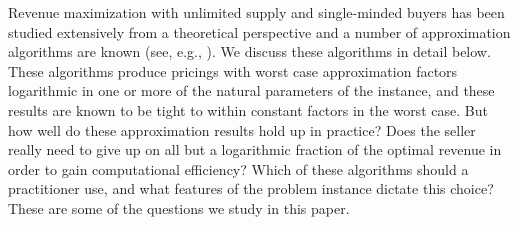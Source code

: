 
Revenue maximization with unlimited supply and single-minded buyers has been studied extensively from a theoretical perspective and a number of approximation algorithms are known (see, e.g., \cite{guruswami2005profit,balcan2006approximation,briest2006single}). We discuss these algorithms in detail below. These algorithms produce pricings with worst case approximation factors logarithmic in one or more of the natural parameters of the instance, and these results are known to be tight to within constant factors in the worst case. But how well do these approximation results hold up in practice? Does the seller really need to give up on all but a logarithmic fraction of the optimal revenue in order to gain computational efficiency? Which of these algorithms should a practitioner use, and what features of the problem instance dictate this choice? These are some of the questions we study in this paper.



